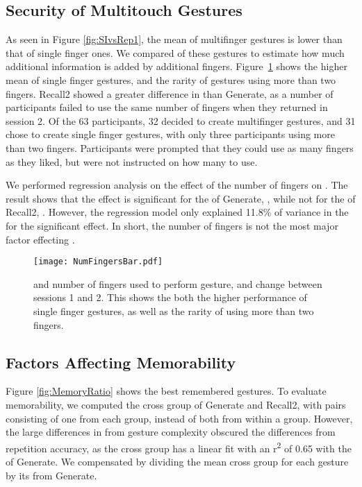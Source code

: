 \documentclass{sig-alternate-10pt}
\begin{document}
\newpage
\subsection{Security of Multitouch Gestures}







  As seen in Figure \ref{fig:SIvsRep1}, the mean  of multifinger gestures is  lower than that of single finger ones. We compared  of these gestures to estimate how much additional information is added by additional fingers. Figure~\ref{fig:barFingers} shows the higher mean  of single finger gestures, and the rarity of gestures using more than two fingers. Recall2 showed a greater difference in   than Generate, as a number of participants failed to use the same number of fingers when they returned in session 2. Of the 63 participants, 32 decided to create multifinger gestures, and 31 chose to create single finger gestures, with only three participants using more than two fingers. Participants were prompted that they could use as many fingers as they liked, but were not instructed on how many to use.

 We performed regression analysis on the effect of the number of fingers  on  . The result shows that the effect is significant for the   of Generate, , while not for the   of Recall2, . However, the regression model only explained 11.8\% of variance in the   for the significant effect. In short, the number of fingers is not the most major factor effecting .

  \begin{figure}[!h]
  \centering
  \texttt{[image: NumFingersBar.pdf]}
  \caption{  and number of fingers used to perform gesture, and change between sessions 1 and 2. This shows the both the higher performance of single finger gestures, as well as the rarity of using more than two fingers.}
  \label{fig:barFingers}
  \end{figure}

\subsection{Factors Affecting Memorability}



Figure \ref{fig:MemoryRatio} shows the best remembered gestures. To evaluate memorability, we computed the cross group  of Generate and Recall2, with pairs consisting of one from each group, instead of both from within a group. However, the large differences in  from gesture complexity obscured the differences from repetition accuracy, as the cross group  has a linear fit with an r\textsuperscript{2} of 0.65 with the  of Generate. We compensated by dividing the mean cross group  for each gesture by its  from Generate. 
\end{document}
